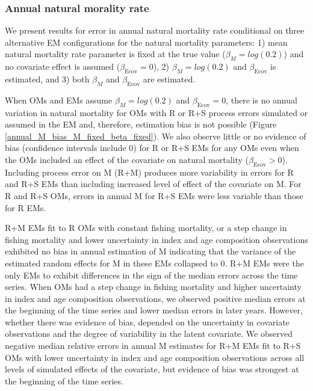 \documentclass[
  12pt,
]{article}
\begin{document}
\hypertarget{annual-natural-morality-rate}{%
\subsubsection*{Annual natural morality rate}\label{annual-natural-morality-rate}}

We present results for error in annual natural mortality rate conditional on three alternative EM configurations for the natural mortality parameters: 1) mean natural mortality rate parameter is fixed at the true value (\(\beta_M = log(0.2)\)) and no covariate effect is assumed (\(\beta_\text{Ecov} = 0\)), 2) \(\beta_M = log(0.2)\) and \(\beta_\text{Ecov}\) is estimated, and 3) both \(\beta_M\) and \(\beta_\text{Ecov}\) are estimated.

When OMs and EMs assume \(\beta_M = log(0.2)\) and \(\beta_\text{Ecov} = 0\), there is no annual variation in natural mortality for OMs with R or R+S process errors simulated or assumed in the EM and, therefore, estimation bias is not possible (Figure \ref{annual_M_bias_M_fixed_beta_fixed}). We also observe little or no evidence of bias (confidence intervals include 0) for R or R+S EMs for any OMs even when the OMs included an effect of the covariate on natural mortality (\(\beta_\text{Ecov} > 0\)). Including process error on M (R+M) produces more variability in errors for R and R+S EMs than including increased level of effect of the covariate on M. For R and R+S OMs, errors in annual M for R+S EMs were less variable than those for R EMs.

R+M EMs fit to R OMs with constant fishing mortality, or a step change in fishing mortality and lower uncertainty in index and age composition observations exhibited no bias in annual estimation of M indicating that the variance of the estimated random effects for M in these EMs collapsed to 0. R+M EMs were the only EMs to exhibit differences in the sign of the median errors across the time series. When OMs had a step change in fishing mortality and higher uncertainty in index and age composition observations, we observed positive median errors at the beginning of the time series and lower median errors in later years. However, whether there was evidence of bias, depended on the uncertainty in covariate observations and the degree of variability in the latent covariate. We observed negative median relative errors in annual M estimates for R+M EMs fit to R+S OMs with lower uncertainty in index and age composition observations across all levels of simulated effects of the covariate, but evidence of bias was strongest at the beginning of the time series.
\end{document}
